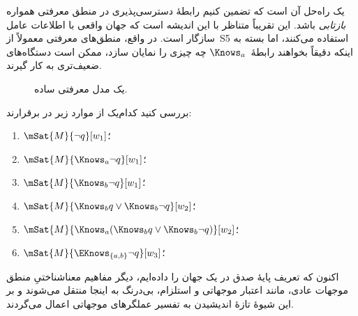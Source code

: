 \documentclass[../../../include/open-logic-section]{subfiles}
\begin{document}
یک راه‌حل آن است که تضمین کنیم رابطهٔ دسترسی‌پذیری در منطق معرفتی همواره
\emph{بازتابی} باشد. این تقریباً متناظر با این اندیشه است که جهان واقعی
با اطلاعات عامل سازگار است. در واقع، منطق‌های معرفتی معمولاً از~S5
استفاده می‌کنند، اما بسته به اینکه دقیقاً بخواهند رابطهٔ~$\Knows_a$ چه
چیزی را نمایان سازد، ممکن است دستگاه‌های ضعیف‌تری به کار گیرند.

\begin{figure}
  \begin{center}
  \end{center}
  \caption{یک مدل معرفتی ساده.}
\end{figure}

\begin{prob}
  بررسی کنید کدام‌یک از موارد زیر در
   برقرارند:
  \begin{enumerate}
    \item $\mSat{M}{\lnot q}[w_1]$؛
    \item $\mSat{M}{\Knows_a \lnot q}[w_1]$؛
    \item $\mSat{M}{\Knows_b \lnot q}[w_1]$؛
    \item $\mSat{M}{\Knows_b q \lor \Knows_b \lnot q}[w_2]$؛
    \item $\mSat{M}{\Knows_a( \Knows_b q \lor \Knows_b \lnot q)}[w_2]$؛
    \item $\mSat{M}{\EKnows_{\{a,b\}} \lnot q}[w_3]$؛
    \end{enumerate}
\end{prob}

اکنون که تعریف پایهٔ صدق در یک جهان را داده‌ایم، دیگر مفاهیم معناشناختیِ
منطق موجهات عادی، مانند اعتبار موجهاتی و استلزام، بی‌درنگ به اینجا منتقل
می‌شوند و بر این شیوهٔ تازهٔ اندیشیدن به تفسیر عملگرهای موجهاتی اعمال
می‌گردند.
\end{document}
